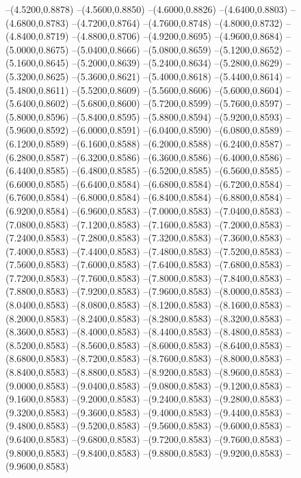 {	--(4.5200,0.8878)
	--(4.5600,0.8850)
	--(4.6000,0.8826)
	--(4.6400,0.8803)
	--(4.6800,0.8783)
	--(4.7200,0.8764)
	--(4.7600,0.8748)
	--(4.8000,0.8732)
	--(4.8400,0.8719)
	--(4.8800,0.8706)
	--(4.9200,0.8695)
	--(4.9600,0.8684)
	--(5.0000,0.8675)
	--(5.0400,0.8666)
	--(5.0800,0.8659)
	--(5.1200,0.8652)
	--(5.1600,0.8645)
	--(5.2000,0.8639)
	--(5.2400,0.8634)
	--(5.2800,0.8629)
	--(5.3200,0.8625)
	--(5.3600,0.8621)
	--(5.4000,0.8618)
	--(5.4400,0.8614)
	--(5.4800,0.8611)
	--(5.5200,0.8609)
	--(5.5600,0.8606)
	--(5.6000,0.8604)
	--(5.6400,0.8602)
	--(5.6800,0.8600)
	--(5.7200,0.8599)
	--(5.7600,0.8597)
	--(5.8000,0.8596)
	--(5.8400,0.8595)
	--(5.8800,0.8594)
	--(5.9200,0.8593)
	--(5.9600,0.8592)
	--(6.0000,0.8591)
	--(6.0400,0.8590)
	--(6.0800,0.8589)
	--(6.1200,0.8589)
	--(6.1600,0.8588)
	--(6.2000,0.8588)
	--(6.2400,0.8587)
	--(6.2800,0.8587)
	--(6.3200,0.8586)
	--(6.3600,0.8586)
	--(6.4000,0.8586)
	--(6.4400,0.8585)
	--(6.4800,0.8585)
	--(6.5200,0.8585)
	--(6.5600,0.8585)
	--(6.6000,0.8585)
	--(6.6400,0.8584)
	--(6.6800,0.8584)
	--(6.7200,0.8584)
	--(6.7600,0.8584)
	--(6.8000,0.8584)
	--(6.8400,0.8584)
	--(6.8800,0.8584)
	--(6.9200,0.8584)
	--(6.9600,0.8583)
	--(7.0000,0.8583)
	--(7.0400,0.8583)
	--(7.0800,0.8583)
	--(7.1200,0.8583)
	--(7.1600,0.8583)
	--(7.2000,0.8583)
	--(7.2400,0.8583)
	--(7.2800,0.8583)
	--(7.3200,0.8583)
	--(7.3600,0.8583)
	--(7.4000,0.8583)
	--(7.4400,0.8583)
	--(7.4800,0.8583)
	--(7.5200,0.8583)
	--(7.5600,0.8583)
	--(7.6000,0.8583)
	--(7.6400,0.8583)
	--(7.6800,0.8583)
	--(7.7200,0.8583)
	--(7.7600,0.8583)
	--(7.8000,0.8583)
	--(7.8400,0.8583)
	--(7.8800,0.8583)
	--(7.9200,0.8583)
	--(7.9600,0.8583)
	--(8.0000,0.8583)
	--(8.0400,0.8583)
	--(8.0800,0.8583)
	--(8.1200,0.8583)
	--(8.1600,0.8583)
	--(8.2000,0.8583)
	--(8.2400,0.8583)
	--(8.2800,0.8583)
	--(8.3200,0.8583)
	--(8.3600,0.8583)
	--(8.4000,0.8583)
	--(8.4400,0.8583)
	--(8.4800,0.8583)
	--(8.5200,0.8583)
	--(8.5600,0.8583)
	--(8.6000,0.8583)
	--(8.6400,0.8583)
	--(8.6800,0.8583)
	--(8.7200,0.8583)
	--(8.7600,0.8583)
	--(8.8000,0.8583)
	--(8.8400,0.8583)
	--(8.8800,0.8583)
	--(8.9200,0.8583)
	--(8.9600,0.8583)
	--(9.0000,0.8583)
	--(9.0400,0.8583)
	--(9.0800,0.8583)
	--(9.1200,0.8583)
	--(9.1600,0.8583)
	--(9.2000,0.8583)
	--(9.2400,0.8583)
	--(9.2800,0.8583)
	--(9.3200,0.8583)
	--(9.3600,0.8583)
	--(9.4000,0.8583)
	--(9.4400,0.8583)
	--(9.4800,0.8583)
	--(9.5200,0.8583)
	--(9.5600,0.8583)
	--(9.6000,0.8583)
	--(9.6400,0.8583)
	--(9.6800,0.8583)
	--(9.7200,0.8583)
	--(9.7600,0.8583)
	--(9.8000,0.8583)
	--(9.8400,0.8583)
	--(9.8800,0.8583)
	--(9.9200,0.8583)
	--(9.9600,0.8583)
}
